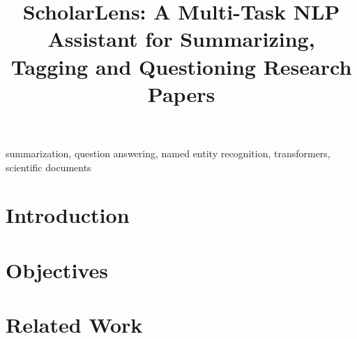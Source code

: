 \documentclass[conference]{IEEEtran}
\begin{document}
\title{ScholarLens: A Multi-Task NLP Assistant for Summarizing, Tagging and Questioning Research Papers}

\author{
}

\maketitle

\begin{abstract}
\end{abstract}

\begin{IEEEkeywords}
summarization, question answering, named entity recognition, transformers, scientific documents
\end{IEEEkeywords}

\section{Introduction}

\section{Objectives}

\section{Related Work}
\end{document}
